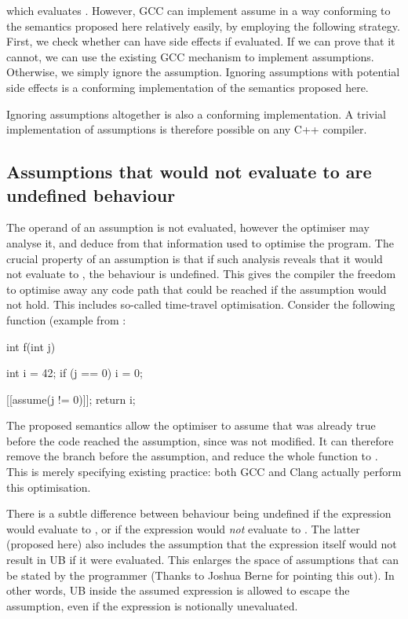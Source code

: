 which evaluates . However, GCC can implement assume in a way conforming to the semantics proposed here relatively easily, by employing the following strategy. First, we check whether  can have side effects if evaluated. If we can prove that it cannot, we can use the existing GCC mechanism to implement assumptions. Otherwise, we simply ignore the assumption. Ignoring assumptions with potential side effects is a conforming implementation of the semantics proposed here.

Ignoring assumptions altogether is also a conforming implementation. A trivial implementation of assumptions is therefore possible on any C++ compiler.

\subsection{Assumptions that would not evaluate to  are undefined behaviour}

The operand of an assumption is not evaluated, however the optimiser may analyse it, and deduce from that information used to optimise the program. The crucial property of an assumption is that if such analysis reveals that it would not evaluate to , the behaviour is undefined. This gives the compiler the freedom to optimise away any code path that could be reached if the assumption would not hold. This includes so-called time-travel optimisation. Consider the following function (example from \cite{P2064R0}:

\begin{codeblock}
int f(int j) {
  int i = 42;
  if (j == 0)
    i = 0;

   [[assume(j != 0)]];
   return i;
}
\end{codeblock}

The proposed semantics allow the optimiser to assume that  was already true before the code reached the assumption, since  was not modified. It can therefore remove the branch before the assumption, and reduce the whole function to . This is merely specifying existing practice: both GCC and Clang actually perform this optimisation.

There is a subtle difference between behaviour being undefined if the expression would evaluate to , or if the expression would \emph{not} evaluate to . The latter (proposed here) also includes the assumption that the expression itself would not result in UB if it were evaluated. This enlarges the space of assumptions that can be stated by the programmer (Thanks to Joshua Berne for pointing this out). In other words, UB inside the assumed expression is allowed to escape the assumption, even if the expression is notionally unevaluated.

